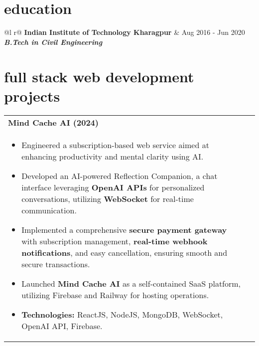 \documentclass[a4paper,8pt]{article}
\begin{document}
\vspace{4 pt}

\section{education}
\begin{tabularx}{\linewidth}{ @{}l r@{} }
\color[HTML]{1C033C} \textbf{Indian Institute of Technology Kharagpur} & \hfill \color[HTML]{371e77} Aug 2016 - Jun 2020 \\[2pt]
\color[HTML]{371e77}\textbf{\textit{B.Tech in Civil Engineering}} \color[HTML]{4B28A4} \\[5pt]
\end{tabularx}

\vspace{-8pt}

\section{full stack web development projects}
\begin{tabularx}{\linewidth}{ @{}l r@{} }
\textbf{Mind Cache AI (2024)} \hfill \color[HTML]{371e77} \\[1pt]
\begin{minipage}[t]{\linewidth}
    \begin{itemize}[nosep,after=\strut, leftmargin=2em, itemsep=2pt]
        \item Engineered a subscription-based web service aimed at enhancing productivity and mental clarity using AI.
        \item Developed an AI-powered Reflection Companion, a chat interface leveraging \textbf{OpenAI APIs} for personalized conversations, utilizing \textbf{WebSocket} for real-time communication.
        \item Implemented a comprehensive \textbf{secure payment gateway} with subscription management, \textbf{real-time webhook notifications}, and easy cancellation, ensuring smooth and secure transactions.
        \item Launched \textbf{Mind Cache AI} as a self-contained SaaS platform, utilizing Firebase and Railway for hosting operations.
        \item \textbf{Technologies:} ReactJS, NodeJS, MongoDB, WebSocket, OpenAI API, Firebase.
    \end{itemize}
\end{minipage}
\end{tabularx}
\end{document}
